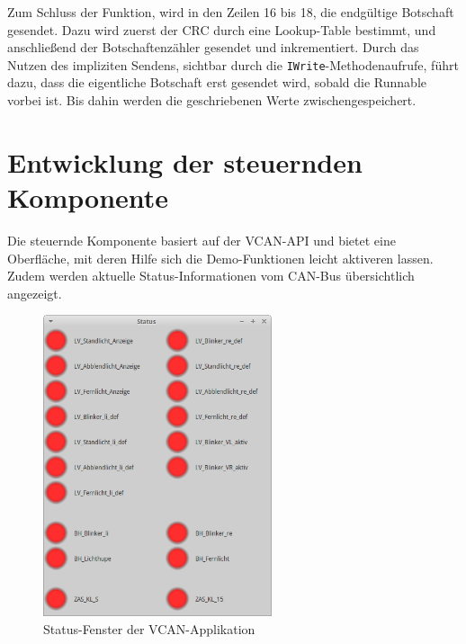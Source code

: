 \documentclass[
  a4paper,					    %
  twoside,
  DIV=calc,     				%
  bibliography=totoc,
  cleardoublepage=empty,
  ngerman,     					%
  final       					%
]{scrbook}
\begin{document}
Zum Schluss der Funktion, wird in den Zeilen 16 bis 18, die endgültige Botschaft gesendet. Dazu wird zuerst der CRC durch eine Lookup-Table bestimmt, und anschließend der Botschaftenzähler gesendet und inkrementiert. Durch das Nutzen des impliziten Sendens, sichtbar durch die \texttt{IWrite}-Methodenaufrufe, führt dazu, dass die eigentliche Botschaft erst gesendet wird, sobald die Runnable vorbei ist. Bis dahin werden die geschriebenen Werte zwischengespeichert.









\section{Entwicklung der steuernden Komponente}
\label{sec:entwicklung_vcan_app}
Die steuernde Komponente basiert auf der VCAN-API und bietet eine Oberfläche, mit deren Hilfe sich die Demo-Funktionen leicht aktiveren lassen. Zudem werden aktuelle Status-Informationen vom CAN-Bus übersichtlich angezeigt. 

\begin{figure}[ht]
\centering
\includegraphics[width=0.6\textwidth]{vcan_app_status}
\caption{Status-Fenster der VCAN-Applikation}
\label{fig:vcan_app_status}
\end{figure}
\end{document}
